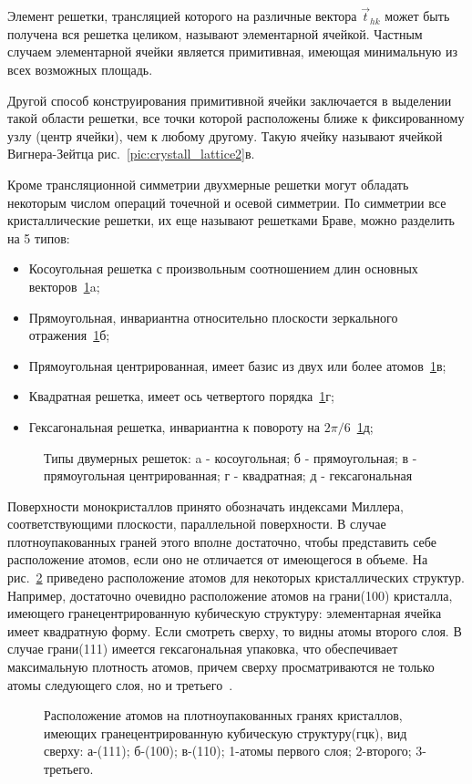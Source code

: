 Элемент решетки, трансляцией которого на различные вектора $\vec{t}_{hk}$
может быть получена вся решетка целиком, называют элементарной ячейкой.
Частным случаем элементарной ячейки является примитивная, имеющая минимальную из всех возможных площадь.


Другой способ конструирования примитивной ячейки заключается в выделении
такой области решетки, все точки которой расположены ближе к фиксированному узлу (центр ячейки), чем к любому другому. Такую ячейку
называют ячейкой Вигнера-Зейтца рис.~\ref{pic:crystall_lattice2}в.


Кроме трансляционной симметрии двухмерные решетки могут обладать
некоторым числом операций точечной и осевой симметрии. По симметрии
все кристаллические решетки, их еще называют решетками Браве, можно
разделить на 5 типов:
\begin{itemize}
	\item Косоугольная решетка с произвольным соотношением длин основных векторов~\ref{pic:2d_lattices}a;
	\item Прямоугольная, инвариантна относительно плоскости зеркального отражения~\ref{pic:2d_lattices}б;
	\item Прямоугольная центрированная, имеет базис из двух или более атомов~\ref{pic:2d_lattices}в;
	\item Квадратная решетка, имеет ось четвертого порядка~\ref{pic:2d_lattices}г;
	\item Гексагональная решетка, инвариантна к повороту на $2\pi/6$~\ref{pic:2d_lattices}д;
\end{itemize}
\begin{figure}[!ht]
\caption{Типы двумерных решеток: a - косоугольная; б - прямоугольная;
в - прямоугольная центрированная; г - квадратная; д - гексагональная}
\label{pic:2d_lattices}
\end{figure}


Поверхности монокристаллов принято обозначать индексами Миллера,
соответствующими плоскости, параллельной поверхности. В случае 
плотноупакованных граней этого вполне достаточно, чтобы представить себе
расположение атомов, если оно не отличается от имеющегося в объеме. На 
рис.~\ref{pic:atoms_in_lattice} приведено расположение атомов для
некоторых кристаллических структур. Например, достаточно очевидно 
расположение атомов на грани(100) кристалла, имеющего гранецентрированную
кубическую структуру: элементарная ячейка имеет квадратную форму. Если
смотреть сверху, то видны атомы второго слоя. В случае грани(111) 
имеется гексагональная упаковка, что обеспечивает максимальную 
плотность атомов, причем сверху просматриваются не только атомы следующего слоя, но и третьего~\cite{Vladimirov_book}.
\begin{figure}[!ht]
\caption{Расположение атомов на плотноупакованных гранях кристаллов,
имеющих гранецентрированную кубическую структуру(гцк), вид сверху:
а-(111); б-(100); в-(110); 1-атомы первого слоя; 2-второго; 3-третьего.}
\label{pic:atoms_in_lattice}
\end{figure}





